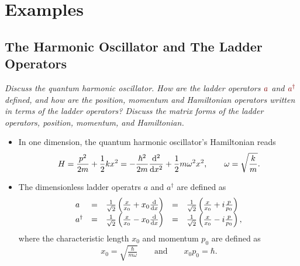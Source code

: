 \documentclass[11pt, a4paper]{article}
\newcommand{\qmath}[1]{\textcolor{Maroon}{#1}}  %
\newcommand{\Ham}{Hamiltonian\xspace}
\begin{document}
\section{Examples}
\subsection{The Harmonic Oscillator and The Ladder Operators}
\textit{Discuss the quantum harmonic oscillator. How are the ladder operators $ \qmath{a} $ and $ \qmath{a^{\dagger}} $ defined, and how are the position, momentum and \Ham operators written in terms of the ladder operators? Discuss the matrix forms of the ladder operators, position, momentum, and \Ham.}

\begin{itemize}

	\item In one dimension, the quantum harmonic oscillator's Hamiltonian reads
	\begin{equation*}
		H = \frac{p^{2}}{2m} + \frac{1}{2}kx^{2} = - \frac{\hbar^{2}}{2m}\dv[2]{}{x} + \frac{1}{2}m \omega^{2}x^{2}, \qquad \omega = \sqrt{\frac{k}{m}}.
	\end{equation*}

    \item The dimensionless ladder operatrs $ a $ and $ a^{\dagger} $ are defined as
    \begin{equation*}
        \begin{array}{lclcl}
            a & = & \frac{1}{\sqrt{2}}\left(\frac{x}{x_{0}} + x_{0} \dv{x}\right) & = & \frac{1}{\sqrt{2}} \left( \frac{x}{x_{0}} + i \frac{p}{p_{0}} \right)\\
            a^{\dagger} & = & \frac{1}{\sqrt{2}}\left(\frac{x}{x_{0}} - x_{0} \dv{x}\right) & = & \frac{1}{\sqrt{2}} \left( \frac{x}{x_{0}} - i \frac{p}{p_{0}} \right),
        \end{array}
    \end{equation*}
    where the characteristic length $ x_{0} $ and momentum $ p_{0} $ are defined as
    \begin{equation*}
        x_{0} = \sqrt{\tfrac{\hbar}{m \omega}} \qquad \text{and} \qquad x_{0} p_{0} = \hbar.
    \end{equation*}


\end{itemize}
\end{document}
